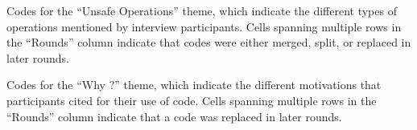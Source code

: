 \begin{table}
\caption{Codes for the ``Unsafe Operations'' theme, which indicate the different types of \unsafe operations mentioned by interview participants. Cells spanning multiple rows in the ``Rounds'' column indicate that codes were either merged, split, or replaced in later rounds.}
\label{table:codes:ops}

\end{table}

\begin{table}
\caption{Codes for the ``Why \unsafe?'' theme, which indicate the different motivations that participants cited for their use of \unsafe code. Cells spanning multiple rows in the ``Rounds'' column indicate that a code was replaced in later rounds.}
\label{table:codes:whyunsafe}

\end{table}









